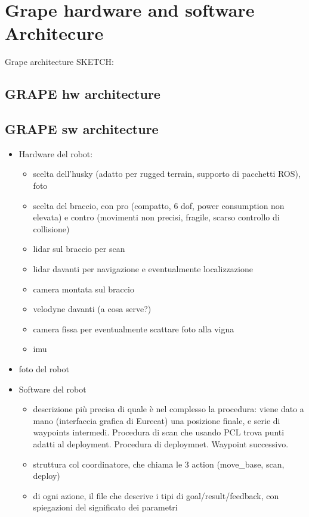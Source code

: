 
\chapter{Grape hardware and software Architecure} \label{chap:grapeSoftwareArchitecture}

Grape architecture SKETCH:

\section{GRAPE hw architecture}\label{sec:grapeHwArch}
\section{GRAPE sw architecture}\label{sec:grapeSwArch}


\begin{itemize}
\item Hardware del robot:
		\begin{itemize}
			\item scelta dell'husky (adatto per rugged terrain, supporto di pacchetti ROS), foto
			\item scelta del braccio, con pro (compatto, 6 dof, power consumption non elevata) e contro (movimenti non precisi, fragile, scarso controllo di collisione)
			\item lidar sul braccio per scan
			\item lidar davanti per navigazione e eventualmente localizzazione
			\item camera montata sul braccio
			\item velodyne davanti (a cosa serve?)
			\item camera fissa per eventualmente scattare foto alla vigna
			\item imu
		\end{itemize}
	\item foto del robot 

\item Software del robot
	\begin{itemize}
		\item descrizione più precisa di quale è nel complesso la procedura: viene dato a mano (interfaccia grafica di Eurecat) una posizione finale, e serie di waypoints intermedi. Procedura di scan che usando PCL trova punti adatti al deployment. Procedura di deploymnet. Waypoint successivo.
		\item struttura col coordinatore, che chiama le 3 action (move\_base, scan, deploy)
		\item di ogni azione, il file che descrive i tipi di goal/result/feedback, con spiegazioni del significato dei parametri
	\end{itemize}
\end{itemize}